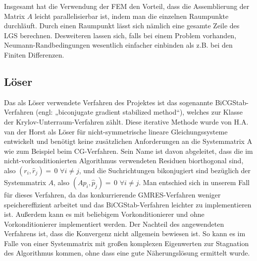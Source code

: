 Insgesamt hat die Verwendung der FEM den Vorteil, dass die Assemblierung der Matrix $A$ leicht parallelisierbar ist, indem man die einzelnen Raumpunkte durchläuft. Durch einen Raumpunkt lässt sich nämlich eine gesamte Zeile des LGS berechnen. Desweiteren lassen sich, falls bei einem Problem vorhanden, Neumann-Randbedingungen wesentlich einfacher einbinden als z.B. bei den Finiten Differenzen. 


\subsection{Löser}
Das als Löser verwendete Verfahren des Projektes ist das sogenannte BiCGStab-Verfahren (engl: „biconjugate gradient stabilized method“), welches zur Klasse der Krylov-Unterraum-Verfahren zählt. Diese iterative Methode wurde von H.A. van der Horst als Löser für nicht-symmetrische lineare Gleichungssysteme entwickelt und benötigt keine zusätzlichen Anforderungen an die Systemmatrix A wie zum Beispiel beim CG-Verfahren. Sein Name ist davon abgeleitet, dass die im nicht-vorkonditionierten Algorithmus verwendeten Residuen biorthogonal sind, also $(r_i,\hat{r}_j)=\,0$ $\forall i\neq j$, und die Suchrichtungen bikonjugiert sind bezüglich der Systemmatrix $A$, also $(Ap_i,\hat{p}_j)=\,0$ $ \forall i \neq j$.  Man entschied sich in unserem Fall für dieses Verfahren, da das konkurrierende GMRES-Verfahren weniger speichereffizient arbeitet und das BiCGStab-Verfahren leichter zu implementieren ist.  Au\ss{}erdem kann es mit beliebigem Vorkonditionierer und ohne Vorkonditionierer implementiert werden. Der Nachteil des angewendeten Verfahrens ist, dass die Konvergenz nicht allgemein bewiesen ist. So kann es im Falle von einer Systemmatrix mit großen komplexen Eigenwerten zur Stagnation des Algorithmus kommen, ohne dass eine gute Näherungslösung ermittelt wurde. \\




